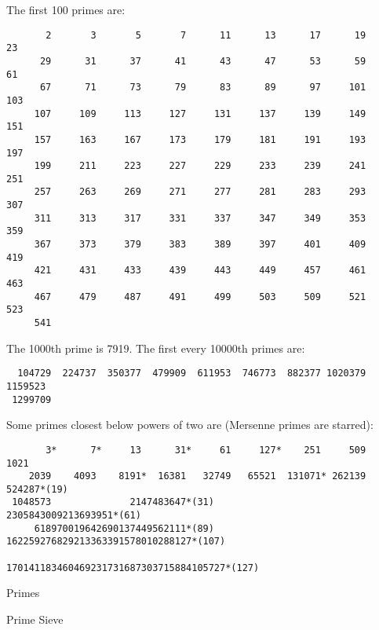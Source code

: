 
The first 100 primes are:
{\small
\begin{verbatim}
       2       3       5       7      11      13      17      19      23 
      29      31      37      41      43      47      53      59      61 
      67      71      73      79      83      89      97     101     103 
     107     109     113     127     131     137     139     149     151 
     157     163     167     173     179     181     191     193     197 
     199     211     223     227     229     233     239     241     251 
     257     263     269     271     277     281     283     293     307 
     311     313     317     331     337     347     349     353     359 
     367     373     379     383     389     397     401     409     419 
     421     431     433     439     443     449     457     461     463 
     467     479     487     491     499     503     509     521     523 
     541
\end{verbatim}
}

The 1000th prime is 7919. The first every 10000th primes are:
{\small
\begin{verbatim}
  104729  224737  350377  479909  611953  746773  882377 1020379 1159523
 1299709
\end{verbatim}
}

Some primes closest below powers of two are (Mersenne primes are starred):
{\small
\begin{verbatim}
       3*      7*     13      31*     61     127*    251     509    1021
    2039    4093    8191*  16381   32749   65521  131071* 262139  524287*(19)
 1048573              2147483647*(31)                2305843009213693951*(61)
     618970019642690137449562111*(89)  162259276829213363391578010288127*(107)
                                 170141183460469231731687303715884105727*(127)
\end{verbatim}
}


\begin{algorithm}{Primes}
\end{algorithm}

\begin{algorithm}{Prime Sieve}
\end{algorithm}

